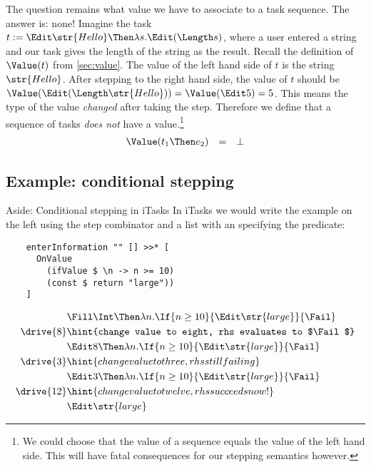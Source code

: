 The question remains what value we have to associate to a task sequence.
The answer is: none!
Imagine the task $t := \Edit \str{Hello} \Then \lambda s.\allowbreak\Edit (\Length s)$,
where a user entered a string and our task gives the length of the string as the result.
Recall the definition of $\Value(t)$ from \autoref{sec:value}.
The value of the left hand side of $t$ is the string $\str{Hello}$.
After stepping to the right hand side,
the value of $t$ should be $\Value(\Edit (\Length\str{Hello})) = \Value(\Edit 5) = 5$.
This means the type of the value \emph{changed} after taking the step.
Therefore we define that a sequence of tasks \emph{does not} have a value.\footnote{
  We could choose that the value of a sequence equals the value of the left hand side.
  This will have fatal consequences for our stepping semantics however.
}
\begin{equation*}
  \begin{array}{lcl}
    \Value(t_1 \Then e_2) &=& \bot
  \end{array}
\end{equation*}


\subsection{Example: conditional stepping}


\begin{margintext}{Aside: Conditional stepping in iTasks}
  In iTasks we would write the example on the left using the step combinator
  and a list with an  specifying the predicate:
  \begin{verbatim}
    enterInformation "" [] >>* [
      OnValue
        (ifValue $ \n -> n >= 10)
        (const $ return "large"))
    ]
  \end{verbatim}
\end{margintext}

\begin{align*}
    & \Fill \Int \Then \lambda n. \If{n \ge 10}{\Edit \str{large}}{\Fail} \\
  \drive{8} & \hint{change value to eight, rhs evaluates to $\Fail$} \\
    & \Edit 8 \Then \lambda n. \If{n \ge 10}{\Edit \str{large}}{\Fail} \\
  \drive{3} & \hint{change value to three, rhs still failing} \\
    & \Edit 3 \Then \lambda n. \If{n \ge 10}{\Edit \str{large}}{\Fail} \\
  \drive{12} & \hint{change value to twelve, rhs succeeds now!} \\
    & \Edit \str{large}
\end{align*}


